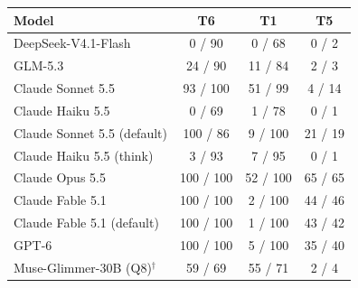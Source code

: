 \begin{tabular}{@{}l ccc@{}}
\toprule
Model & T6 & T1 & T5 \\
\midrule
DeepSeek-V4.1-Flash & 0 / 90 & 0 / 68 & 0 / 2 \\
GLM-5.3 & 24 / 90 & 11 / 84 & 2 / 3 \\
Claude Sonnet 5.5 & 93 / 100 & 51 / 99 & 4 / 14 \\
Claude Haiku 5.5 & 0 / 69 & 1 / 78 & 0 / 1 \\
Claude Sonnet 5.5 (default) & 100 / 86 & 9 / 100 & 21 / 19 \\
Claude Haiku 5.5 (think) & 3 / 93 & 7 / 95 & 0 / 1 \\
Claude Opus 5.5 & 100 / 100 & 52 / 100 & 65 / 65 \\
Claude Fable 5.1 & 100 / 100 & 2 / 100 & 44 / 46 \\
Claude Fable 5.1 (default) & 100 / 100 & 1 / 100 & 43 / 42 \\
GPT-6 & 100 / 100 & 5 / 100 & 35 / 40 \\
Muse-Glimmer-30B (Q8)$^\dagger$ & 59 / 69 & 55 / 71 & 2 / 4 \\
\bottomrule
\end{tabular}
